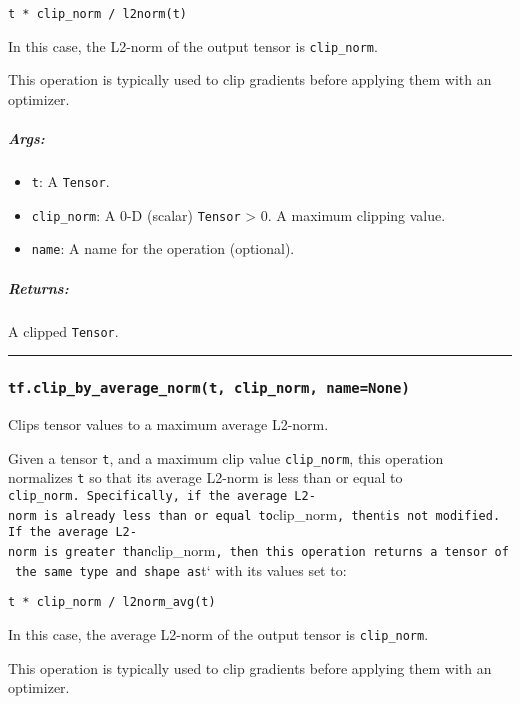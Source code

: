 \texttt{t\ *\ clip\_norm\ /\ l2norm(t)}

In this case, the L2-norm of the output tensor is \texttt{clip\_norm}.

This operation is typically used to clip gradients before applying them
with an optimizer.

\subparagraph{Args: }\label{args-14}

\begin{itemize}
\tightlist
\item
  \texttt{t}: A \texttt{Tensor}.
\item
  \texttt{clip\_norm}: A 0-D (scalar) \texttt{Tensor} \textgreater{} 0.
  A maximum clipping value.
\item
  \texttt{name}: A name for the operation (optional).
\end{itemize}

\subparagraph{Returns: }\label{returns-8}

A clipped \texttt{Tensor}.

\begin{center}\rule{0.5\linewidth}{\linethickness}\end{center}

\subsubsection{\texorpdfstring{\texttt{tf.clip\_by\_average\_norm(t,\ clip\_norm,\ name=None)}
}{tf.clip\_by\_average\_norm(t, clip\_norm, name=None) }}\label{tf.clipux5fbyux5faverageux5fnormt-clipux5fnorm-namenone}

Clips tensor values to a maximum average L2-norm.

Given a tensor \texttt{t}, and a maximum clip value \texttt{clip\_norm},
this operation normalizes \texttt{t} so that its average L2-norm is less
than or equal to
\texttt{clip\_norm\textquotesingle{}.\ Specifically,\ if\ the\ average\ L2-norm\ is\ already\ less\ than\ or\ equal\ to}clip\_norm\texttt{,\ then}t\texttt{is\ not\ modified.\ If\ the\ average\ L2-norm\ is\ greater\ than}clip\_norm\texttt{,\ then\ this\ operation\ returns\ a\ tensor\ of\ the\ same\ type\ and\ shape\ as}t`
with its values set to:

\texttt{t\ *\ clip\_norm\ /\ l2norm\_avg(t)}

In this case, the average L2-norm of the output tensor is
\texttt{clip\_norm}.

This operation is typically used to clip gradients before applying them
with an optimizer.


